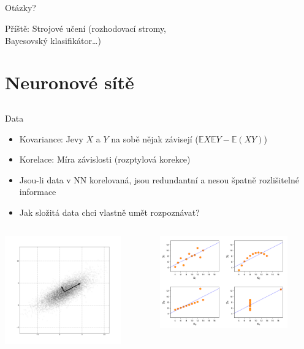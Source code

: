 \documentclass{beamer}
\begin{document}
\subsection{}
\begin{frame}{Otázky?}
\begin{center}
Příště: Strojové učení (rozhodovací stromy, \\ Bayesovský klasifikátor\dots)
\end{center}
\end{frame}

\section{Neuronové sítě}

\subsection{}
\begin{frame}{Data}
\begin{itemize}
\item Kovariance: Jevy $X$ a $Y$ na sobě nějak závisejí ($\mathbb{E}X\mathbb{E}Y - \mathbb{E}(XY)$)
\item Korelace: Míra závislosti (rozptylová korekce)
\item Jsou-li data v NN korelovaná, jsou redundantní a nesou špatně rozlišitelné informace
\item Jak složitá data chci vlastně umět rozpoznávat?
\end{itemize}
\begin{columns}
\begin{column}{5.5cm}
\includegraphics[width=5cm]{GaussianScatterPCA.png}
\end{column}
\begin{column}{5.5cm}
\includegraphics[width=5.5cm]{Anscombe's_quartet_3.pdf}
\end{column}
\end{columns}
\end{frame}
\end{document}
